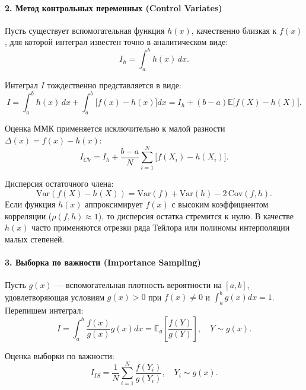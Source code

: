 \documentclass[11pt,a4paper]{article}
\begin{document}
\paragraph{2. Метод контрольных переменных (Control Variates)}
Пусть существует вспомогательная функция $h(x)$, качественно близкая к $f(x)$, для которой интеграл известен точно в аналитическом виде:
\begin{equation}
    I_h = \int_{a}^{b} h(x)\,dx.
\end{equation}

Интеграл $I$ тождественно представляется в виде:
\begin{equation}
    I = \int_{a}^{b} h(x)\,dx + \int_{a}^{b} \big[ f(x) - h(x) \big] dx = I_h + (b - a) \mathbb{E}\big[ f(X) - h(X) \big].
\end{equation}

Оценка ММК применяется исключительно к малой разности $\Delta(x) = f(x) - h(x)$:
\begin{equation}
    I_{CV} = I_h + \frac{b - a}{N} \sum_{i=1}^N \big[ f(X_i) - h(X_i) \big].
\end{equation}

Дисперсия остаточного члена:
\begin{equation}
    \mathrm{Var}(f(X) - h(X)) = \mathrm{Var}(f) + \mathrm{Var}(h) - 2\,\mathrm{Cov}(f, h).
\end{equation}
Если функция $h(x)$ аппроксимирует $f(x)$ с высоким коэффициентом корреляции ($\rho(f,h) \approx 1$), то дисперсия остатка стремится к нулю. В качестве $h(x)$ часто применяются отрезки ряда Тейлора или полиномы интерполяции малых степеней.

\paragraph{3. Выборка по важности (Importance Sampling)}
Пусть $g(x)$ --- вспомогательная плотность вероятности на $[a,b]$, удовлетворяющая условиям $g(x) > 0$ при $f(x) \ne 0$ и $\int_a^b g(x) dx = 1$. Перепишем интеграл:
\begin{equation}
    I = \int_{a}^{b} \frac{f(x)}{g(x)} g(x) dx = \mathbb{E}_g \left[ \frac{f(Y)}{g(Y)} \right], \quad Y \sim g(x).
\end{equation}

Оценка выборки по важности:
\begin{equation}
    I_{IS} = \frac{1}{N} \sum_{i=1}^N \frac{f(Y_i)}{g(Y_i)}, \quad Y_i \sim g(x).
\end{equation}
\end{document}
